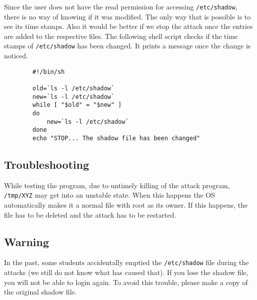 Since the user does not have the read permission for accessing {\tt /etc/shadow},
there is no way of knowing if it was modified. The only way that is possible is
to see its time stamps. Also it would be better if we stop the attack once the
entries are added to the respective files. The following shell script checks if
the time stamps of {\tt /etc/shadow} has been changed. 
It prints a message once the change is noticed. 

\begin{verbatim}
        #!/bin/sh

        old=`ls -l /etc/shadow`
        new=`ls -l /etc/shadow`
        while [ "$old" = "$new" ]
        do
            new=`ls -l /etc/shadow`
        done
        echo "STOP... The shadow file has been changed"
\end{verbatim}

\subsection{Troubleshooting}

While testing the program, due to untimely killing of the attack program,
{\tt /tmp/XYZ} may get into an unstable state. When this happens the OS automatically
makes it a normal file with root as its owner. If this happens, the file has to
be deleted and the attack has to be restarted.

\subsection{Warning}

In the past, some students accidentally emptied the {\tt /etc/shadow} file 
during the attacks (we still do not know what has caused that). If you lose
the shadow file, you will not be able to login again. To avoid this 
trouble, please make a copy of the original shadow file. 



